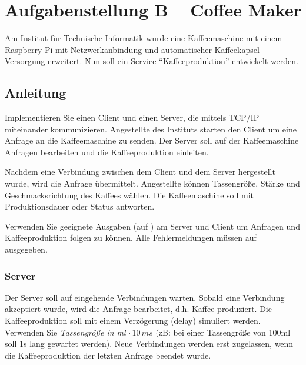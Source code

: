 

\usepackage{bytefield}

\newcommand{\baselinecenterit}[1]{%
  \centering
  \raisebox{0pt}[\heightof{W}][0pt]{\itshape #1}%
}



\section*{Aufgabenstellung B -- Coffee Maker}\label{sec:aufgabenstellung}

Am Institut für Technische Informatik wurde eine Kaffeemaschine mit einem
Raspberry Pi mit Netzwerkanbindung und automatischer Kaffeekapsel-Versorgung
erweitert. Nun soll ein Service ``Kaffeeproduktion'' entwickelt werden.

\subsection*{Anleitung}
Implementieren Sie einen Client und einen Server, die mittels TCP/IP
miteinander kommunizieren. Angestellte des Instituts starten den Client um eine
Anfrage an die Kaffeemaschine zu senden. Der Server soll auf der Kaffeemaschine
Anfragen bearbeiten und die Kaffeeproduktion einleiten.

Nachdem eine Verbindung zwischen dem Client und dem Server hergestellt wurde,
wird die Anfrage übermittelt. Angestellte können Tassengröße, Stärke und
Geschmacksrichtung des Kaffees wählen. Die Kaffeemaschine soll mit
Produktionsdauer oder Status antworten.

Verwenden Sie geeignete Ausgaben (auf ) am Server und Client
um Anfragen und Kaffeeproduktion folgen zu können. Alle Fehlermeldungen müssen
auf  ausgegeben.

\subsubsection*{Server}
Der Server soll auf eingehende Verbindungen warten. Sobald eine Verbindung
akzeptiert wurde, wird die Anfrage bearbeitet, d.h. Kaffee produziert. Die
Kaffeeproduktion soll mit einem Verzögerung (delay) simuliert werden. Verwenden
Sie \emph{Tassengröße in ml} $\cdot \, 10 \, ms$ (zB: bei einer Tassengröße von 100ml
soll 1s lang gewartet werden). Neue Verbindungen werden erst zugelassen, wenn
die Kaffeeproduktion der letzten Anfrage beendet wurde.

